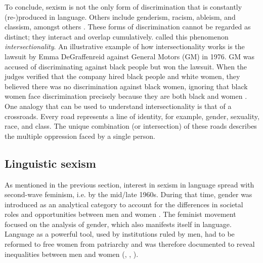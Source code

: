 To conclude, sexism is not the only form of discrimination that is constantly (re-)produced in language. Others include genderism, racism, ableism, and classism, amongst others \citep[11]{sprachhandeln2015tun}. These forms of discrimination cannot be regarded as distinct; they interact and overlap cumulatively. \textcite{crenshaw1989demarginalizing} called this phenomenon \textit{intersectionality}. An illustrative example of how intersectionality works is the lawsuit by Emma DeGraffenreid against General Motors (GM) in 1976. GM was accused of discriminating against black people but won the lawsuit. When the judges verified that the company hired black people and white women, they believed there was no discrimination against black women, ignoring that black women face discrimination precisely because they are both black and women \citep[142f]{crenshaw1989demarginalizing}. One analogy that can be used to understand intersectionality is that of a crossroads. Every road represents a line of identity, for example, gender, sexuality, race, and class. The unique combination (or intersection) of these roads describes the multiple oppression faced by a single person.


\subsection{Linguistic sexism} \label{Sexism in language}

As mentioned in the previous section, interest in sexism in language spread with second-wave feminism, i.e. by the mid/late 1960s. During that time, gender was introduced as an analytical category to account for the differences in societal roles and opportunities between men and women \citep[5]{von2016translation}. The feminist movement focused on the analysis of gender, which also manifests itself in language. Language as a powerful tool, used by institutions ruled by men, had to be reformed to free women from patriarchy and was therefore documented to reveal inequalities between men and women (\cite[73]{von1991feminist}, \cite[552f]{pauwels2003linguistic}, \cite[17]{von2016translation}).

